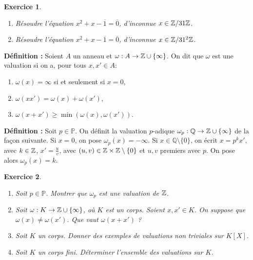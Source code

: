 \documentclass[11pt,a4paper]{article}
\newtheorem{ex}{Exercice}
\begin{document}
\begin{ex}
\begin{enumerate}
\item Résoudre l'équation $x^2+x-\overline{1}=\overline{0}$, d'inconnue $x\in \mathbb{Z}/31\mathbb{Z}$. 

\item Résoudre l'équation $x^2+x-\overline{1}=\overline{0}$, d'inconnue $x\in \mathbb{Z}/31^2\mathbb{Z}$. 
\end{enumerate} 
\end{ex}



\textbf{Définition : } 
Soient $A$ un anneau et $\omega:A\rightarrow \mathbb{Z}\cup \{\infty\}$. On dit que $\omega$ est une valuation si on a, pour tous $x,x'\in A$:  \begin{enumerate}
\item $\omega(x)=\infty$ si et seulement si $x=0$,

\item $\omega(xx')=\omega(x)+\omega(x')$,

\item $\omega(x+x')\geq \min (\omega(x),\omega(x'))$.
\end{enumerate}



\textbf{Définition : }
Soit $p\in \mathbb{P}$. On définit la valuation $p$-adique $\omega_p:\mathbb{Q}\rightarrow \mathbb{Z}\cup \{\infty\}$ de la façon suivante. Si $x=0$, on pose $\omega_p(x)=-\infty$. Si $x\in \mathbb{Q}\setminus \{0\}$, on écrit $x=p^k x' $, avec $k\in \mathbb{Z}$, $x'=\frac{u}{v}$, avec $(u,v)\in \mathbb{Z}\times \mathbb{Z}\setminus \{0\}$ et $u,v$ premiers avec $p$. On pose alors $\omega_p(x)=k$.

\begin{ex}\label{e_val}
\begin{enumerate}
\item Soit $p\in \mathbb{P}$. Montrer que $\omega_p$ est une valuation de $\mathbb{Z}$. 

\item\label{q_som} Soit $\omega:K\rightarrow \mathbb{Z}\cup \{\infty\}$, où $K$ est un corps. Soient $x,x'\in K$. On suppose que $\omega(x)\neq \omega(x')$. Que vaut $\omega(x+x')$ ?

\item Soit $K$ un corps. Donner des exemples de valuations non triviales  sur $K[X]$. 

\item Soit $K$ un corps fini. Déterminer l'ensemble des valuations sur $K$.
\end{enumerate}
\end{ex}
\end{document}
